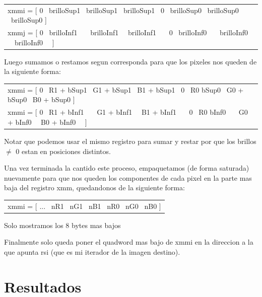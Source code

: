 \documentclass[a4paper]{article}
\begin{document}
\begin{center}
	\begin{tabular}{l}
		xmmi = [ 0 \textpipe\ brilloSup1 \textpipe\ brilloSup1 \textpipe\ brilloSup1 \textpipe\ 0 \textpipe\ brilloSup0 \textpipe\ brilloSup0 \textpipe\ brilloSup0 ] \\
		xmmj = [ 0 \textpipe\ brilloInf1 \ \  \textpipe\ brilloInf1 \ \textpipe\ brilloInf1 \ \ \textpipe\ 0 \textpipe\ brilloInf0 \ \ \textpipe\ brilloInf0 \ \textpipe\ brilloInf0 \ \ ]
	\end{tabular}
\end{center}


Luego sumamos o restamos segun corresponda para que los pixeles nos queden de la siguiente forma:

\begin{center}
	\begin{tabular}{l}
		xmmi = [ 0 \textpipe\ R1 + bSup1 \textpipe\ G1 + bSup1 \textpipe\ B1 + bSup1 \textpipe\ 0 \textpipe\ R0 bSup0 \textpipe\ G0 + bSup0 \textpipe\ B0 + bSup0 ] \\
		
		xmmi = [ 0 \textpipe\ R1 + bInf1 \ \  \textpipe\ G1 + bInf1 \ \textpipe\ B1 + bInf1 \ \ \textpipe\ 0 \textpipe\ R0 bInf0 \ \ \textpipe\ G0 + bInf0 \ \textpipe\ B0 + bInf0 \ \ ]
		 
	\end{tabular}
\end{center}

Notar que podemos usar el mismo registro para sumar y restar por que los brillos $\neq$ 0 estan en posiciones distintos.

Una vez terminada la cantido este proceso, empaquetamos (de forma saturada) nuevamente para que nos queden los componentes de cada pixel en la parte mas baja del registro xmm, quedandonos de la siguiente forma:

\begin{center}
	\begin{tabular}{l}
		xmmi = [ ... \textpipe\ nR1 \textpipe\ nG1 \textpipe\ nB1 \textpipe\ nR0 \textpipe\ nG0 \textpipe\ nB0 ]
	\end{tabular}
	
	Solo mostramos los 8 bytes mas bajos
\end{center}


Finalmente solo queda poner el quadword mas bajo de xmmi en la direccion a la que apunta rsi (que es mi iterador de la imagen destino).

\section{Resultados}
\end{document}
